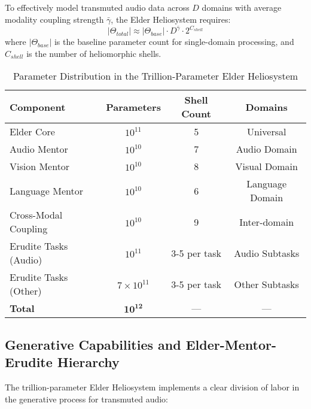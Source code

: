 \begin{theorem}
To effectively model transmuted audio data across $D$ domains with average modality coupling strength $\bar{\gamma}$, the Elder Heliosystem requires:
\begin{equation}
|\Theta_{total}| \approx |\Theta_{base}| \cdot D^{\bar{\gamma}} \cdot 2^{C_{shell}}
\end{equation}
where $|\Theta_{base}|$ is the baseline parameter count for single-domain processing, and $C_{shell}$ is the number of heliomorphic shells.
\end{theorem}

\begin{table}[h]
\centering
\caption{Parameter Distribution in the Trillion-Parameter Elder Heliosystem}
\label{tab:parameter_distribution}
\begin{tabular}{|l|c|c|c|}
\hline
\textbf{Component} & \textbf{Parameters} & \textbf{Shell Count} & \textbf{Domains} \\
\hline
Elder Core & $10^{11}$ & 5 & Universal \\
\hline
Audio Mentor & $10^{10}$ & 7 & Audio Domain \\
\hline
Vision Mentor & $10^{10}$ & 8 & Visual Domain \\
\hline
Language Mentor & $10^{10}$ & 6 & Language Domain \\
\hline
Cross-Modal Coupling & $10^{10}$ & 9 & Inter-domain \\
\hline
Erudite Tasks (Audio) & $10^{11}$ & 3-5 per task & Audio Subtasks \\
\hline
Erudite Tasks (Other) & $7 \times 10^{11}$ & 3-5 per task & Other Subtasks \\
\hline
\textbf{Total} & $\mathbf{10^{12}}$ & — & — \\
\hline
\end{tabular}
\end{table}

\subsection{Generative Capabilities and Elder-Mentor-Erudite Hierarchy}

The trillion-parameter Elder Heliosystem implements a clear division of labor in the generative process for transmuted audio:

